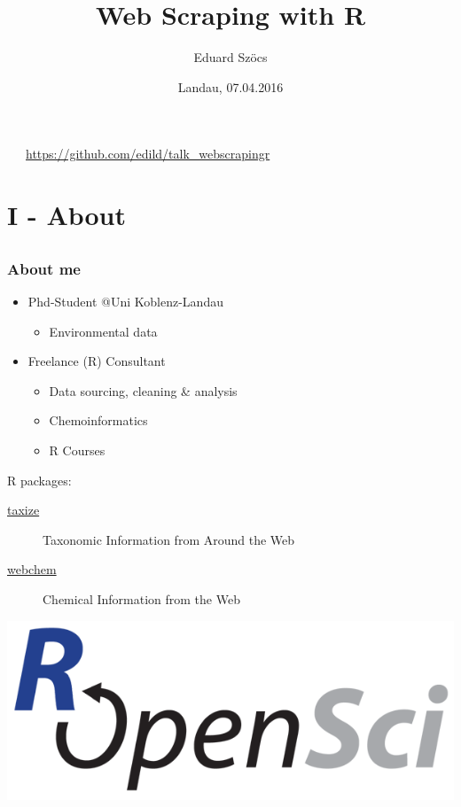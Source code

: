 \documentclass[12pt, t]{beamer}
\title{Web Scraping with R}
\author{Eduard Szöcs}
\institute{Institute for Environmental Sciences, UnVersity of Koblenz-Landau}
\date{Landau, 07.04.2016}
\begin{document}
\begin{frame}
\vspace*{1.5cm}
\titlepage
\vspace*{1.5cm}
\textcolor{hilight}{\faGift}~~~\textcolor{title}{\href{https://github.com/edild/talk_webscrapingr}{https://github.com/edild/talk\_webscrapingr}}

\end{frame}


\section{I - About} 
\subsection{}
\begin{frame}
\frametitle{About me}
\begin{itemize}
\item Phd-Student @Uni Koblenz-Landau
	\begin{itemize}
	  \item Environmental data
	\end{itemize}
\item Freelance (R) Consultant
	\begin{itemize}
		\item Data sourcing, cleaning \& analysis
		\item Chemoinformatics
		\item R Courses
	\end{itemize}
\end{itemize}
\pause
\vspace{1.5em}
R packages:
\begin{description}
	\item[\href{https://github.com/ropensci/taxize}{taxize}]{Taxonomic Information from Around the Web}
	\item[\href{https://github.com/ropensci/webchem}{webchem}]{Chemical Information from the Web}
\end{description}
\begin{centering}
\colorbox{white}{\includegraphics[width =.3\textwidth]{fig/ropensci.png}}
\end{centering}
\end{frame}
\end{document}

